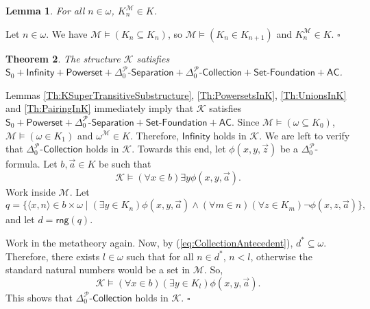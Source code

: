 \documentclass[11pt, a4paper]{article}
\newcounter{Theor1}
\newtheorem{theorem}{Theorem}[section]
\newtheorem{lemma}[theorem]{Lemma}
\newenvironment{proof}[1][Proof]{\begin{trivlist}
\item[\hskip \labelsep {\bfseries #1}]}{\end{trivlist}}
\begin{document}
\begin{lemma} 
For all $n \in \omega$, $K_n^{\mathcal{M}} \in K$.
\end{lemma}

\begin{proof}
Let $n \in \omega$. We have $\mathcal{M} \models (K_n \subseteq K_n)$, so $\mathcal{M} \models (K_n \in K_{n+1})$ and $K_n^{\mathcal{M}} \in K$. \hfill$\square$
\end{proof}

\begin{theorem}
The structure $\mathcal{K}$ satisfies $\mathsf{S}_0+\textsf{Infinity}+\textsf{Powerset}+\Delta_0^{\mathcal{P}}\textsf{-Separation}+\Delta_0^{\mathcal{P}}\textsf{-Collection}+\textsf{Set-Foundation}+\mathsf{AC}$.
\end{theorem}

\begin{proof}
Lemmas \ref{Th:KSuperTransitiveSubstructure}, \ref{Th:PowersetsInK}, \ref{Th:UnionsInK} and \ref{Th:PairingInK} immediately imply that $\mathcal{K}$ satisfies $\mathsf{S}_0+\textsf{Powerset}+\Delta_0^{\mathcal{P}}\textsf{-Separation}+\textsf{Set-Foundation}+\mathsf{AC}$. Since $\mathcal{M} \models (\omega \subseteq K_0)$, $\mathcal{M} \models (\omega \in K_1)$ and $\omega^{\mathcal{M}} \in K$. Therefore, $\textsf{Infinity}$ holds in $\mathcal{K}$. We are left to verify that $\Delta_0^{\mathcal{P}}\textsf{-Collection}$ holds in $\mathcal{K}$. Towards this end, let $\phi(x, y, \vec{z})$ be a $\Delta_0^{\mathcal{P}}$-formula. Let $b, \vec{a} \in K$ be such that 
\begin{equation} \label{eq:CollectionAntecedent}
\mathcal{K} \models (\forall x \in b)\exists y \phi(x, y, \vec{a}).
\end{equation}
Work inside $\mathcal{M}$. Let
\[
q= \{ \langle x, n \rangle \in b \times \omega \mid (\exists y \in K_n) \phi(x, y, \vec{a}) \land (\forall m \in n)(\forall z \in K_m) \neg \phi(x, z, \vec{a})\},
\]
and let $d= \mathsf{rng}(q)$.

Work in the metatheory again. Now, by (\ref{eq:CollectionAntecedent}), $d^* \subseteq \omega$. Therefore, there exists $l \in \omega$ such that for all $n \in d^*$, $n < l$, otherwise the standard natural numbers would be a set in $\mathcal{M}$. So, 
\[
\mathcal{K} \models (\forall x \in b)(\exists y \in K_l)\phi(x, y, \vec{a}).
\]
This shows that $\Delta_0^{\mathcal{P}}\textsf{-Collection}$ holds in $\mathcal{K}$. \hfill$\square$  
\end{proof}
\end{document}
